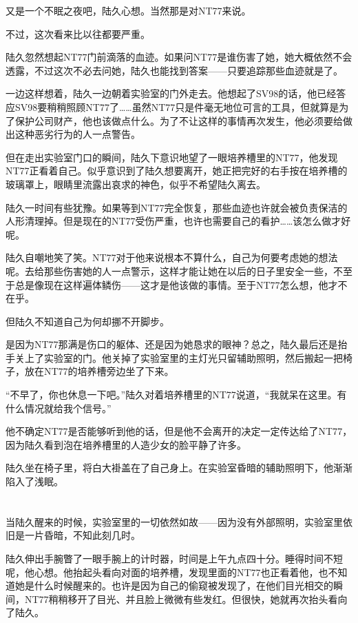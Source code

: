 又是一个不眠之夜吧，陆久心想。当然那是对NT77来说。

不过，这次看来比以往都要严重。

陆久忽然想起NT77门前滴落的血迹。如果问NT77是谁伤害了她，她大概依然不会透露，不过这次不必去问她，陆久也能找到答案——只要追踪那些血迹就是了。

一边这样想着，陆久一边朝着实验室的门外走去。他想起了SV98的话，他已经答应SV98要稍稍照顾NT77了……虽然NT77只是件毫无地位可言的工具，但就算是为了保护公司财产，他也该做点什么。为了不让这样的事情再次发生，他必须要给做出这种恶劣行为的人一点警告。

但在走出实验室门口的瞬间，陆久下意识地望了一眼培养槽里的NT77，他发现NT77正看着自己。似乎意识到了陆久想要离开，她正把完好的右手按在培养槽的玻璃罩上，眼睛里流露出哀求的神色，似乎不希望陆久离去。

陆久一时间有些犹豫。如果等到NT77完全恢复，那些血迹也许就会被负责保洁的人形清理掉。但是现在的NT77受伤严重，也许也需要自己的看护……该怎么做才好呢。

陆久自嘲地笑了笑。NT77对于他来说根本不算什么，自己为何要考虑她的想法呢。去给那些伤害她的人一点警示，这样才能让她在以后的日子里安全一些，不至于总是像现在这样遍体鳞伤——这才是他该做的事情。至于NT77怎么想，他才不在乎。

但陆久不知道自己为何却挪不开脚步。

是因为NT77那满是伤口的躯体、还是因为她恳求的眼神？总之，陆久最后还是抬手关上了实验室的门。他关掉了实验室里的主灯光只留辅助照明，然后搬起一把椅子，放在NT77的培养槽旁边坐了下来。

“不早了，你也休息一下吧。”陆久对着培养槽里的NT77说道，“我就呆在这里。有什么情况就给我个信号。”

他不确定NT77是否能够听到他的话，但是他不会离开的决定一定传达给了NT77，因为陆久看到泡在培养槽里的人造少女的脸平静了许多。

陆久坐在椅子里，将白大褂盖在了自己身上。在实验室昏暗的辅助照明下，他渐渐陷入了浅眠。\section*{}

当陆久醒来的时候，实验室里的一切依然如故——因为没有外部照明，实验室里依旧是一片昏暗，不知此刻几时。

陆久伸出手腕瞥了一眼手腕上的计时器，时间是上午九点四十分。睡得时间不短呢，他心想。他抬起头看向对面的培养槽，发现里面的NT77也正看着他，也不知道她是什么时候醒来的。也许是因为自己的偷窥被发现了，在他们目光相交的瞬间，NT77稍稍移开了目光、并且脸上微微有些发红。但很快，她就再次抬头看向了陆久。

